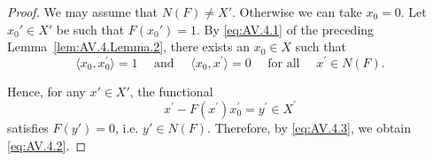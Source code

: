 \begin{proof}
 We may assume that $N(F) \neq X'$. Otherwise we can take $x_{0} = 0$. Let $x_{0}' \in X'$ be such that $F(x_{0}') = 1$. By \eqref{eq:AV.4.1} of the preceding Lemma~\ref{lem:AV.4.Lemma.2}, there exists an $x_{0} \in X$ such that 
\begin{equation}\label{eq:AV.4.3}
\langle x _{0}, x _{0} ^{\prime} \rangle = 1 \quad \text{ and } \quad \langle x _{0}, x ^{\prime} \rangle = 0 \quad \text{ for all } \quad x ^{\prime} \in N (F). \end{equation}

Hence, for any $x' \in X'$, the functional 
\[
x ^{\prime} - F \left(x ^{\prime}\right) x _{0} ^{\prime} = y ^{\prime} \in X ^{\prime}
\]
satisfies $F(y') = 0$, i.e. $y' \in N(F)$. Therefore, by \eqref{eq:AV.4.3}, we obtain \eqref{eq:AV.4.2}. 
\end{proof}

